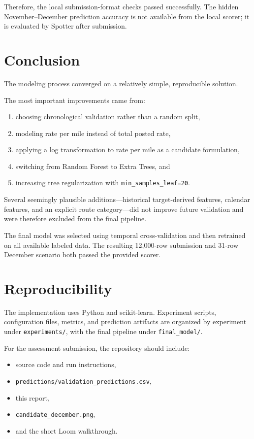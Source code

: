 \documentclass[11pt,a4paper]{article}
\begin{document}
Therefore, the local submission-format checks passed successfully. The hidden November--December prediction accuracy is not available from the local scorer; it is evaluated by Spotter after submission.

\section{Conclusion}

The modeling process converged on a relatively simple, reproducible solution.

The most important improvements came from:
\begin{enumerate}
    \item choosing chronological validation rather than a random split,
    \item modeling rate per mile instead of total posted rate,
    \item applying a log transformation to rate per mile as a candidate formulation,
    \item switching from Random Forest to Extra Trees, and
    \item increasing tree regularization with \texttt{min\_samples\_leaf=20}.
\end{enumerate}

Several seemingly plausible additions---historical target-derived features, calendar features, and an explicit route category---did not improve future validation and were therefore excluded from the final pipeline.

The final model was selected using temporal cross-validation and then retrained on all available labeled data. The resulting 12,000-row submission and 31-row December scenario both passed the provided scorer.

\section*{Reproducibility}

The implementation uses Python and scikit-learn. Experiment scripts, configuration files, metrics, and prediction artifacts are organized by experiment under \texttt{experiments/}, with the final pipeline under \texttt{final\_model/}.

For the assessment submission, the repository should include:
\begin{itemize}
    \item source code and run instructions,
    \item \texttt{predictions/validation\_predictions.csv},
    \item this report,
    \item \texttt{candidate\_december.png},
    \item and the short Loom walkthrough.
\end{itemize}
\end{document}
